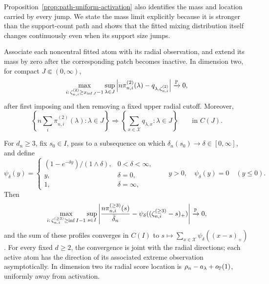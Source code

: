 Proposition~\ref{prop:path-uniform-activation} also identifies the mass and
location carried by every jump. We state
the mass limit explicitly because it is stronger than the support-count path
and shows that the fitted mixing distribution itself changes continuously even
when its support size jumps.

\begin{proposition}
\label{prop:path-masses}
Associate each noncentral fitted atom with its radial observation, and extend
its mass by zero after the corresponding patch becomes inactive. In dimension
two, for compact \(J\Subset(0,\infty)\),
\begin{equation}
\label{eq:path-d2-mass-limit}
 \max_{i:\,\zeta_{n,i}^{(2)}\ge x_{\inf J}-1}
 \sup_{\lambda\in J}
 \left|n\pi_{n,i}^{(2)}(\lambda)
       -q_{\lambda,\zeta_{n,i}^{(2)}}\right|
 \xrightarrow{\mathbb P}0,
\end{equation}
after first imposing and then removing a fixed upper radial cutoff. Moreover,
\begin{equation}
\label{eq:path-d2-total-mass-limit}
 \left\{n\sum_i\pi_{n,i}^{(2)}(\lambda):\lambda\in J\right\}
 \Longrightarrow
 \left\{\sum_{x\in\mathcal X}q_{\lambda,x}:\lambda\in J\right\}
 \qquad\text{in }C(J).
\end{equation}

For \(d_n\ge3\), fix \(s_0\in I\), pass to a subsequence on which
\(\delta_n(s_0)\to\delta\in[0,\infty]\), and define
\[
 \psi_\delta(y)=
 \begin{cases}
 (1-e^{-\delta y})/(1\wedge\delta),&0<\delta<\infty,\\
 y,&\delta=0,\\
 1,&\delta=\infty,
 \end{cases}
 \qquad y>0,
 \quad \psi_\delta(y)=0\quad(y\le0).
\]
Then
\begin{equation}
\label{eq:path-highd-mass-limit}
 \max_{i:\,\zeta_{n,i}^{(\ge3)}\ge\inf I-1}
 \sup_{s\in I}
 \left|\frac{n\pi_{n,i}^{(\ge3)}(s)}{\bar\delta_n}
       -\psi_\delta((\zeta_{n,i}^{(\ge3)}-s)_+)\right|
 \xrightarrow{\mathbb P}0,
\end{equation}
and the sum of these profiles converges in \(C(I)\) to
\(s\mapsto\sum_{x\in\mathcal X}\psi_\delta((x-s)_+)\). For every fixed
\(d\ge2\), the convergence is joint with the radial directions; each active
atom has the direction of its associated extreme observation asymptotically.
In dimension two its radial score location is
\(\rho_n-a_\lambda+o_{\mathbb P}(1)\), uniformly away from activation.
\end{proposition}

